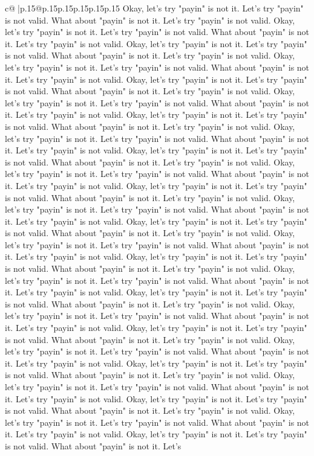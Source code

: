 \documentclass{article}
\begin{document}
{\begin{supertabular}{c@{$\;$}|p{.15\linewidth}@{}p{.15\linewidth}p{.15\linewidth}p{.15\linewidth}p{.15\linewidth}p{.15\linewidth}}
{{{Okay, let's try "payin" is not it. Let's try "payin" is not valid. What about "payin" is not it. Let's try "payin" is not valid. Okay, let's try "payin" is not it. Let's try "payin" is not valid. What about "payin" is not it. Let's try "payin" is not valid. Okay, let's try "payin" is not it. Let's try "payin" is not valid. What about "payin" is not it. Let's try "payin" is not valid. Okay, let's try "payin" is not it. Let's try "payin" is not valid. What about "payin" is not it. Let's try "payin" is not valid. Okay, let's try "payin" is not it. Let's try "payin" is not valid. What about "payin" is not it. Let's try "payin" is not valid. Okay, let's try "payin" is not it. Let's try "payin" is not valid. What about "payin" is not it. Let's try "payin" is not valid. Okay, let's try "payin" is not it. Let's try "payin" is not valid. What about "payin" is not it. Let's try "payin" is not valid. Okay, let's try "payin" is not it. Let's try "payin" is not valid. What about "payin" is not it. Let's try "payin" is not valid. Okay, let's try "payin" is not it. Let's try "payin" is not valid. What about "payin" is not it. Let's try "payin" is not valid. Okay, let's try "payin" is not it. Let's try "payin" is not valid. What about "payin" is not it. Let's try "payin" is not valid. Okay, let's try "payin" is not it. Let's try "payin" is not valid. What about "payin" is not it. Let's try "payin" is not valid. Okay, let's try "payin" is not it. Let's try "payin" is not valid. What about "payin" is not it. Let's try "payin" is not valid. Okay, let's try "payin" is not it. Let's try "payin" is not valid. What about "payin" is not it. Let's try "payin" is not valid. Okay, let's try "payin" is not it. Let's try "payin" is not valid. What about "payin" is not it. Let's try "payin" is not valid. Okay, let's try "payin" is not it. Let's try "payin" is not valid. What about "payin" is not it. Let's try "payin" is not valid. Okay, let's try "payin" is not it. Let's try "payin" is not valid. What about "payin" is not it. Let's try "payin" is not valid. Okay, let's try "payin" is not it. Let's try "payin" is not valid. What about "payin" is not it. Let's try "payin" is not valid. Okay, let's try "payin" is not it. Let's try "payin" is not valid. What about "payin" is not it. Let's try "payin" is not valid. Okay, let's try "payin" is not it. Let's try "payin" is not valid. What about "payin" is not it. Let's try "payin" is not valid. Okay, let's try "payin" is not it. Let's try "payin" is not valid. What about "payin" is not it. Let's try "payin" is not valid. Okay, let's try "payin" is not it. Let's try "payin" is not valid. What about "payin" is not it. Let's try "payin" is not valid. Okay, let's try "payin" is not it. Let's try "payin" is not valid. What about "payin" is not it. Let's try "payin" is not valid. Okay, let's try "payin" is not it. Let's try "payin" is not valid. What about "payin" is not it. Let's try "payin" is not valid. Okay, let's try "payin" is not it. Let's try "payin" is not valid. What about "payin" is not it. Let's try "payin" is not valid. Okay, let's try "payin" is not it. Let's try "payin" is not valid. What about "payin" is not it. Let's }}}
\end{supertabular}}
\end{document}
